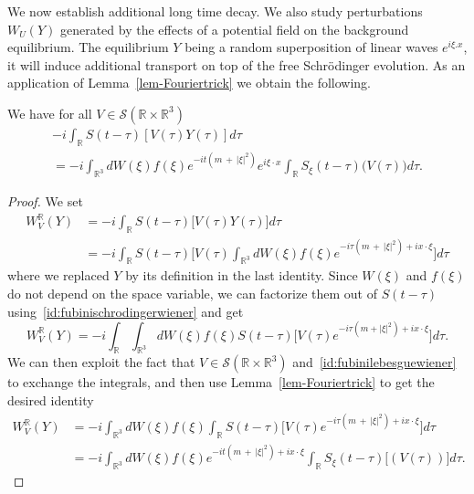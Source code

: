 \documentclass[AHL, Unicode, longabstracts,published]{cedram}
\newcommand{\R}{\mathbb{R}}
\newcommand{\mclS}{\mathcal{S}}
\begin{document}
We now establish additional long time decay. We also study perturbations $W_U(Y)$ generated by the effects of a potential field on the background equilibrium. The equilibrium $Y$ being a random superposition of linear waves $e^{i\xi.x}$, it will induce additional transport on top of the free Schr\"odinger evolution. As an application of Lemma~\ref{lem-Fouriertrick} we obtain the following.


\begin{lemm}\label{lem:expressionWVY}
We have for all $V \in \mclS(\R\times \R^3)$
\begin{multline*}
-i\int_{\R} S(t-\tau) [V(\tau) Y(\tau)] d\tau \\= -i \int_{\R^3} dW(\xi) f(\xi) e^{-it\left(m\,+\,|\xi|^2\right)} e^{i\xi \cdot x} \int_{\R} S_\xi (t-\tau) \Big(V(\tau)\Big) d\tau.
\end{multline*}
\end{lemm}

\begin{proof}
We set
\begin{equation}\label{def:mathcalWV}
\begin{split}
 W_V^{\R}(Y) &= -i \int_{\R} S(t-\tau) \Big[V(\tau) Y(\tau) \Big] d\tau \\
& = -i \int_{\R}S(t-\tau)\Big[V(\tau) \int_{\R^3} dW(\xi) f(\xi) e^{-i\tau\left(m\,+\,|\xi|^2\right) + ix\cdot \xi} \Big] d\tau
\end{split}
\end{equation}
where we replaced $Y$ by its definition in the last identity. Since $W(\xi)$ and $f(\xi)$ do not depend on the space variable, we can factorize them out of $S(t-\tau)$ using~\eqref{id:fubinischrodingerwiener} and get
\[
W_V^{\R}(Y) = -i \int_{\R} \int_{\R^3} dW(\xi) f(\xi) S(t-\tau)\Big[V(\tau) e^{-i\tau(m+|\xi|^2) + ix\cdot \xi} \Big] d\tau.
\]
We can then exploit the fact that $V \in \mclS(\R\times \R^3)$ and~\eqref{id:fubinilebesguewiener} to exchange the integrals, and then use Lemma~\ref{lem-Fouriertrick} to get the desired identity
\begin{align*}
W_V^{\R}(Y) &= -i \int_{\R^3} dW(\xi) f(\xi) \int_{\R} S(t-\tau)\Big[V(\tau) e^{-i\tau\left(m\,+\,|\xi|^2\right) + ix\cdot \xi} \Big] d\tau\\
&=-i \int_{\R^3} dW(\xi) f(\xi) e^{-it\left(m\,+\,|\xi|^2\right) + ix\cdot \xi} \int_{\R} S_\xi (t-\tau)\Big[(V(\tau)) \Big] d\tau.
\end{align*}
\end{proof}
\end{document}
